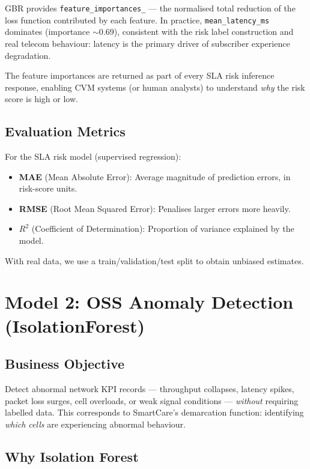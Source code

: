GBR provides \texttt{feature\_importances\_} --- the normalised total reduction of the loss function contributed by each feature. In practice, \texttt{mean\_latency\_ms} dominates (importance $\sim 0.69$), consistent with the risk label construction and real telecom behaviour: latency is the primary driver of subscriber experience degradation.

The feature importances are returned as part of every SLA risk inference response, enabling CVM systems (or human analysts) to understand \emph{why} the risk score is high or low.

\subsection{Evaluation Metrics}

For the SLA risk model (supervised regression):
\begin{itemize}
  \item \textbf{MAE} (Mean Absolute Error): Average magnitude of prediction errors, in risk-score units.
  \item \textbf{RMSE} (Root Mean Squared Error): Penalises larger errors more heavily.
  \item \textbf{$R^2$} (Coefficient of Determination): Proportion of variance explained by the model.
\end{itemize}

With real data, we use a train/validation/test split to obtain unbiased estimates.

\section{Model 2: OSS Anomaly Detection (IsolationForest)}

\subsection{Business Objective}

Detect abnormal network KPI records --- throughput collapses, latency spikes, packet loss surges, cell overloads, or weak signal conditions --- \emph{without} requiring labelled data. This corresponds to SmartCare's demarcation function: identifying \emph{which cells} are experiencing abnormal behaviour.

\subsection{Why Isolation Forest}


